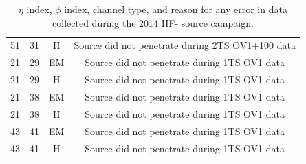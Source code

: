 \begin{table}[htb]
{\begin{tabular}{|c|c|c|c|}
  51 & 31 & H & Source did not penetrate during 2TS OV1+100 data \\
  21 & 29 & EM & Source did not penetrate during 1TS OV1 data \\
  21 & 29 & H & Source did not penetrate during 1TS OV1 data \\
  21 & 38 & EM & Source did not penetrate during 1TS OV1 data \\
  21 & 38 & H & Source did not penetrate during 1TS OV1 data \\
  43 & 41 & EM & Source did not penetrate during 1TS OV1 data \\
  43 & 41 & H & Source did not penetrate during 1TS OV1 data \\
  \hline
  \end{tabular}}
  \caption{$\eta$ index, $\phi$ index, channel type, and reason for any
  error in data collected during the 2014 HF- source campaign.}
  \label{tab:2014HFM_Errors}
\end{table}
